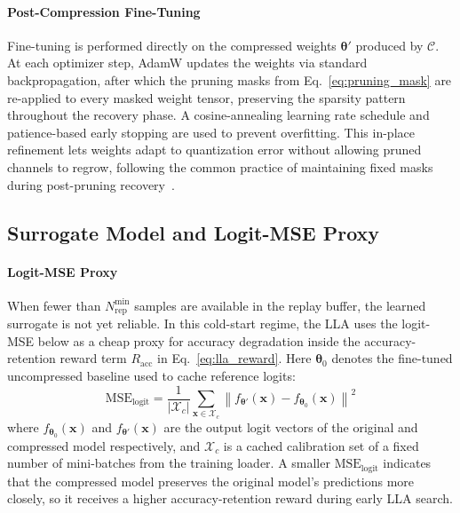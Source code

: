 \documentclass[preprint,12pt,authoryear]{elsarticle}
\begin{document}
\paragraph{Post-Compression Fine-Tuning}
Fine-tuning is performed directly on the compressed weights $\boldsymbol{\theta}'$
produced by $\mathcal{C}$. At each optimizer step, AdamW updates the weights via
standard backpropagation, after which the pruning masks from
Eq.~\eqref{eq:pruning_mask} are re-applied to every masked weight tensor, preserving
the sparsity pattern throughout the recovery phase. A cosine-annealing learning rate
schedule and patience-based early stopping are used to prevent overfitting. This
in-place refinement lets weights adapt to quantization error without allowing pruned
channels to regrow, following the common practice of maintaining fixed masks during
post-pruning recovery~\citep{han2015learning,anwar2017structured}.

\subsection{Surrogate Model and Logit-MSE Proxy}
\label{sec:surrogate}

\paragraph{Logit-MSE Proxy}
When fewer than $N_{\mathrm{rep}}^{\min}$ samples are available in the replay buffer,
the learned surrogate is not yet reliable. In this cold-start regime, the LLA uses the
logit-MSE below as a cheap proxy for accuracy degradation inside the accuracy-retention
reward term $R_{\mathrm{acc}}$ in Eq.~\eqref{eq:lla_reward}. Here
$\boldsymbol{\theta}_0$ denotes the fine-tuned uncompressed baseline used to cache
reference logits:
\begin{equation}
    \mathrm{MSE}_{\mathrm{logit}} =
    \frac{1}{|\mathcal{X}_c|}
    \sum_{\mathbf{x} \in \mathcal{X}_c}
    \left\| f_{\boldsymbol{\theta}'}(\mathbf{x})
          - f_{\boldsymbol{\theta}_0}(\mathbf{x}) \right\|^2
    \label{eq:logit_mse}
\end{equation}
where $f_{\boldsymbol{\theta}_0}(\mathbf{x})$ and
$f_{\boldsymbol{\theta}'}(\mathbf{x})$ are the output logit vectors of the original and
compressed model respectively, and $\mathcal{X}_c$ is a cached calibration set of a
fixed number of mini-batches from the training loader. A smaller
$\mathrm{MSE}_{\mathrm{logit}}$ indicates that the compressed model preserves the
original model's predictions more closely, so it receives a higher accuracy-retention
reward during early LLA search.
\end{document}
